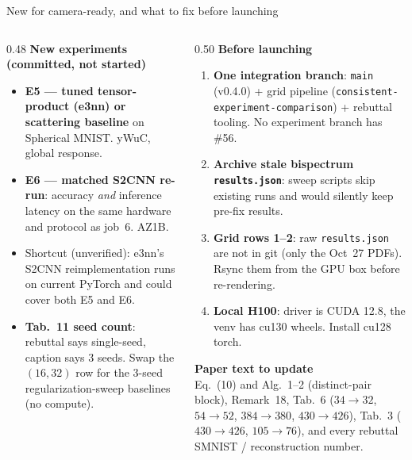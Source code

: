 \documentclass[aspectratio=169,10pt]{beamer}
\newcommand{\code}[1]{\texttt{#1}}
\begin{document}
\begin{frame}[t]{New for camera-ready, and what to fix before launching}
\vspace{0.6em}
\begin{columns}[T]
\begin{column}{0.48\textwidth}
\textbf{\small New experiments (committed, not started)}
\scriptsize
\begin{itemize}\setlength{\itemsep}{0.5em}
\item \textbf{E5 --- tuned tensor-product (e3nn) or scattering baseline} on Spherical MNIST. \textcolor{muted}{yWuC, global response.}
\item \textbf{E6 --- matched S2CNN re-run}: accuracy \emph{and} inference latency on the same hardware and protocol as job~6. \textcolor{muted}{AZ1B.}
\item \textcolor{muted}{Shortcut (unverified):} e3nn's S2CNN reimplementation runs on current PyTorch and could cover both E5 and E6.
\item \textbf{Tab.~11 seed count}: rebuttal says single-seed, caption says 3 seeds. Swap the $(16,32)$ row for the 3-seed regularization-sweep baselines (no compute).
\end{itemize}
\end{column}
\begin{column}{0.50\textwidth}
\textbf{\small Before launching}
\scriptsize
\begin{enumerate}\setlength{\itemsep}{0.5em}
\item \textbf{One integration branch}: \code{main} (v0.4.0) + grid pipeline (\code{consistent-experiment-comparison}) + rebuttal tooling. No experiment branch has \#56.
\item \textbf{Archive stale bispectrum \code{results.json}}: sweep scripts skip existing runs and would silently keep pre-fix results.
\item \textbf{Grid rows 1--2}: raw \code{results.json} are not in git (only the Oct~27 PDFs). Rsync them from the GPU box before re-rendering.
\item \textbf{Local H100}: driver is CUDA 12.8, the venv has cu130 wheels. Install cu128 torch.
\end{enumerate}
\vspace{0.4em}
\textbf{\small Paper text to update}\\[0.2em]
\scriptsize Eq.~(10) and Alg.~1--2 (distinct-pair block), Remark~18, Tab.~6 ($34{\to}32$, $54{\to}52$, $384{\to}380$, $430{\to}426$), Tab.~3 ($430{\to}426$, $105{\to}76$), and every rebuttal SMNIST / reconstruction number.
\end{column}
\end{columns}
\end{frame}
\end{document}

